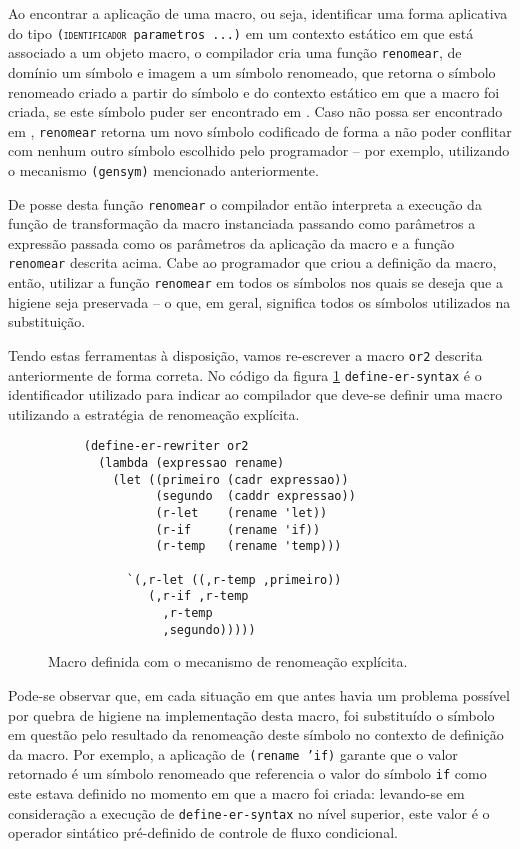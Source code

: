 Ao encontrar a aplicação de uma macro, ou seja, identificar uma forma
aplicativa do tipo \texttt{(\textsc{identificador} parametros ...)} em um
contexto estático em que  está associado a um objeto macro,
o compilador cria uma função \texttt{renomear}, de domínio um símbolo 
e imagem a um símbolo renomeado, que retorna o símbolo renomeado criado a
partir do símbolo  e do contexto estático  em que a macro foi
criada, se este símbolo puder ser encontrado em .  Caso  não
possa ser encontrado em , \texttt{renomear} retorna um novo símbolo
codificado de forma a não poder conflitar com nenhum outro símbolo escolhido
pelo programador -- por exemplo, utilizando o mecanismo \texttt{(gensym)}
mencionado anteriormente.

De posse desta função \texttt{renomear} o compilador então interpreta a
execução da função de transformação da macro instanciada passando como
parâmetros a expressão passada como os parâmetros da aplicação da macro e a
função \texttt{renomear} descrita acima. Cabe ao programador que criou a 
definição da macro, então, utilizar a função \texttt{renomear}  em todos os 
símbolos nos quais se deseja que a higiene seja preservada -- o que, em geral,
significa todos os símbolos utilizados na substituição.

Tendo estas ferramentas à disposição, vamos re-escrever a macro \texttt{or2}
descrita anteriormente de forma correta. No código da figura
\ref{fig:renomeacao-explicita} \texttt{define-er-syntax} é o identificador
utilizado para indicar ao compilador que deve-se definir uma macro utilizando a
estratégia de renomeação explícita.

\begin{figure}[h!]
\begin{lstlisting}
     (define-er-rewriter or2
       (lambda (expressao rename)
         (let ((primeiro (cadr expressao))
               (segundo  (caddr expressao))
               (r-let    (rename 'let))
               (r-if     (rename 'if))
               (r-temp   (rename 'temp)))
               
           `(,r-let ((,r-temp ,primeiro))
              (,r-if ,r-temp 
                ,r-temp
                ,segundo)))))
\end{lstlisting}
\caption{Macro definida com o mecanismo de renomeação explícita.}
\label{fig:renomeacao-explicita}
\end{figure}

Pode-se observar que, em cada situação em que antes havia um problema possível
por quebra de higiene na implementação desta macro, foi substituído o símbolo
em questão pelo resultado da renomeação deste símbolo no contexto de definição
da macro. Por exemplo, a aplicação de \texttt{(rename 'if)} garante que o valor
retornado é um símbolo renomeado que referencia o valor do símbolo \texttt{if}
como este estava definido no momento em que a macro foi criada: levando-se em
consideração a execução de \texttt{define-er-syntax} no nível superior, este
valor é o operador sintático pré-definido de controle de fluxo condicional.

